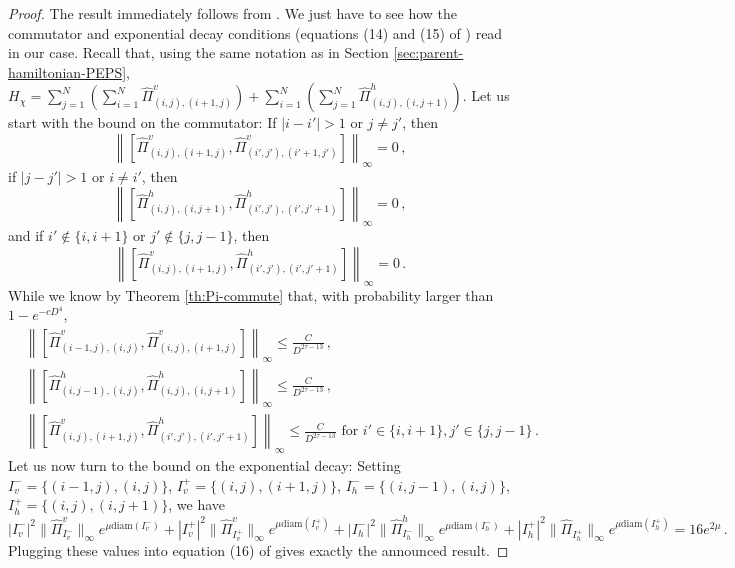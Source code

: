 \documentclass{amsart}
\renewcommand{\leq}{\leqslant}
\begin{document}
\begin{proof}
    The result immediately follows from \cite[Lemma 12]{HHKL}. We just have to see how the commutator and exponential decay conditions (equations (14) and (15) of \cite{HHKL}) read in our case.
    Recall that, using the same notation as in Section \ref{sec:parent-hamiltonian-PEPS}, $H_{\chi} = \sum_{j=1}^N \left( \sum_{i=1}^N \hat{\Pi}^v_{(i,j),(i+1,j)} \right) + \sum_{i=1}^N \left( \sum_{j=1}^N \hat{\Pi}^h_{(i,j),(i,j+1)} \right)$. Let us start with the bound on the commutator: If $|i-i'|>1$ or $j\neq j'$, then
    \[  \left\| \left[ \hat{\Pi}^v_{(i,j),(i+1,j)}, \hat{\Pi}^v_{(i',j'),(i'+1,j')} \right] \right\|_{\infty}=0 \, , \]
    if $|j-j'|>1$ or $i\neq i'$, then
    \[  \left\| \left[ \hat{\Pi}^h_{(i,j),(i,j+1)}, \hat{\Pi}^h_{(i',j'),(i',j'+1)} \right] \right\|_{\infty}=0 \, , \]
    and if $i'\notin\{i,i+1\}$ or $j'\notin\{j,j-1\}$, then
    \[  \left\| \left[ \hat{\Pi}^v_{(i,j),(i+1,j)}, \hat{\Pi}^h_{(i',j'),(i',j'+1)} \right] \right\|_{\infty}=0 \, . \]
    While we know by Theorem \ref{th:Pi-commute} that, with probability larger than $1-e^{-cD^4}$,
    \begin{align*}
         & \left\| \left[ \hat{\Pi}^v_{(i-1,j),(i,j)}, \hat{\Pi}^v_{(i,j),(i+1,j)} \right] \right\|_{\infty} \leq \frac{C}{D^{2\tau-13}} \, ,                                                \\
         & \left\| \left[ \hat{\Pi}^h_{(i,j-1),(i,j)}, \hat{\Pi}^h_{(i,j),(i,j+1)} \right] \right\|_{\infty} \leq \frac{C}{D^{2\tau-13}} \, ,                                                \\
         & \left\| \left[ \hat{\Pi}^v_{(i,j),(i+1,j)}, \hat{\Pi}^h_{(i',j'),(i',j'+1)} \right] \right\|_{\infty} \leq \frac{C}{D^{2\tau-13}} \text{ for } i'\in\{i,i+1\},j'\in\{j,j-1\} \, .
    \end{align*}
    Let us now turn to the bound on the exponential decay: Setting $I_v^-=\{(i-1,j),(i,j)\}$, $I_v^+=\{(i,j),(i+1,j)\}$, $I_h^-=\{(i,j-1),(i,j)\}$, $I_h^+=\{(i,j),(i,j+1)\}$, we have
    \[ |I_v^-|^2\|\hat{\Pi}^v_{I_v^-}\|_{\infty}e^{\mu\mathrm{diam}(I_v^-)} + |I_v^+|^2\|\hat{\Pi}^v_{I_v^+}\|_{\infty}e^{\mu\mathrm{diam}(I_v^+)} + |I_h^-|^2\|\hat{\Pi}^h_{I_h^-}\|_{\infty}e^{\mu\mathrm{diam}(I_h^-)} + |I_h^+|^2\|\hat{\Pi}_{I_h^+}\|_{\infty}e^{\mu\mathrm{diam}(I_h^+)} = 16e^{2\mu} \, . \]
    Plugging these values into equation (16) of \cite{HHKL} gives exactly the announced result.
\end{proof}
\end{document}

